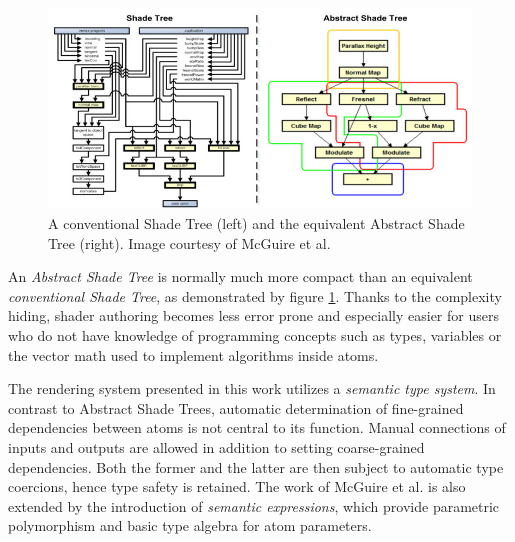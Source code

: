 \begin{figure}[h!]
  \centering
    \includegraphics[width=0.9\linewidth]{./Chapters/AbstractShadeTree.jpg}
    \caption[Abstract Shade Tree]{A conventional Shade Tree (left) and the equivalent Abstract Shade Tree (right). Image courtesy of McGuire et al.}
  \label{fig:AbstractShadeTree}
\end{figure}

An \emph{Abstract Shade Tree} is normally much more compact than an equivalent \emph{conventional Shade Tree}, as demonstrated by figure \ref{fig:AbstractShadeTree}. Thanks to the complexity hiding, shader authoring becomes less error prone and especially easier for users who do not have knowledge of programming concepts such as types, variables or the vector math used to implement algorithms inside atoms.
 
The rendering system presented in this work utilizes a \emph{semantic type system}. In contrast to Abstract Shade Trees, automatic determination of fine-grained dependencies between atoms is not central to its function. Manual connections of inputs and outputs are allowed in addition to setting coarse-grained dependencies. Both the former and the latter are then subject to automatic type coercions, hence type safety is retained. The work of McGuire et al. is also extended by the introduction of \emph{semantic expressions}, which provide parametric polymorphism and basic type algebra for atom parameters.
